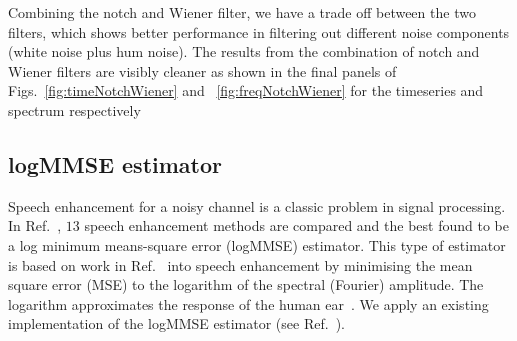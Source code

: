 \documentclass[paper-main.tex]{subfiles}
\begin{document}
Combining the notch and Wiener filter, we have a trade off between the two filters, which shows better performance in filtering out different noise components (white noise plus hum noise). 
The results from the combination of notch and Wiener filters are visibly cleaner as shown in the final panels of Figs.~\ref{fig:timeNotchWiener} and ~\ref{fig:freqNotchWiener} for the timeseries and spectrum respectively 













\subsection{logMMSE estimator}
\label{sec:logmmse}

Speech enhancement for a noisy channel is a classic problem in signal processing. 
In Ref.~\cite{SubjectiveComparison}, $13$ speech enhancement methods are compared and the best found to be a log minimum means-square error (logMMSE) estimator. 
This type of estimator is based on work in Ref.~\cite{Ephraim1984SpeechEU_logMMSE} into speech enhancement by minimising the mean square error (MSE) to the logarithm of the spectral (Fourier) amplitude.
The logarithm approximates the response of the human ear~\cite{SubjectiveComparison}.
We apply an existing implementation of the logMMSE estimator (see Ref.~\cite{logmmse}).
\end{document}
